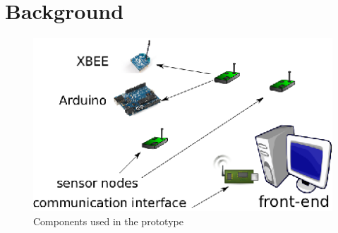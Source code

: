 \section{Background}\label{sec:background}

\begin{figure}[t]
\centering
\includegraphics[scale=1.2]{figures/topology.eps}
\caption{Components used in the prototype}
\label{fig:topology}
\end{figure}

